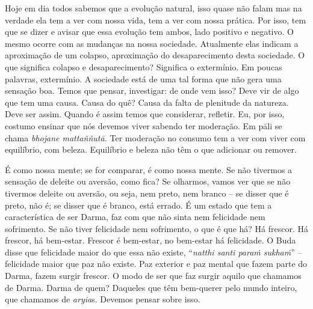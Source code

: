 Hoje em dia todos sabemos que a evolução natural, isso quase não
falam mas na verdade ela tem a ver com nossa vida, tem a ver com nossa
prática. Por isso, tem que se dizer e avisar que essa evolução tem
ambos, lado positivo e negativo. O mesmo ocorre com as mudanças na
nossa sociedade. Atualmente elas indicam a aproximação de um colapso,
aproximação do desaparecimento desta sociedade. O que significa colapso
e desaparecimento? Significa o extermínio. Em poucas palavras,
extermínio. A sociedade está de uma tal forma que não gera uma sensação
boa. Temos que pensar, investigar: de onde vem isso? Deve vir de algo
que tem uma causa. Causa do quê? Causa da falta de plenitude da
natureza. Deve ser assim. Quando é assim temos que considerar,
refletir. Eu, por isso, costumo ensinar que nós devemos viver sabendo
ter moderação. Em pāli se chama \emph{bhojane mattaññutā.} Ter
moderação no consumo tem a ver com viver com equilíbrio, com beleza.
Equilíbrio e beleza não têm o que adicionar ou remover. 

É como nossa mente; se for comparar, é como nossa mente. Se não
tivermos a sensação de deleite ou aversão, como fica? Se olharmos,
vamos ver que se não tivermos deleite ou aversão, ou seja, nem preto,
nem branco – se disser que é preto, não é; se disser que é branco, está
errado. É um estado que tem a característica de ser Darma, faz com que
não sinta nem felicidade nem sofrimento. Se não tiver felicidade nem
sofrimento, o que é que há? Há frescor. Há frescor, há bem-estar.
Frescor é bem-estar, no bem-estar há felicidade. O Buda disse que
felicidade maior do que essa não existe, “\emph{natthi santi paraṁ
sukhaṁ}” – felicidade maior que paz não existe. Paz exterior e
paz mental que fazem parte do Darma, fazem surgir frescor. O modo de
ser que faz surgir aquilo que chamamos de Darma. Darma de quem?
Daqueles que têm bem-querer pelo mundo inteiro, que chamamos de
\emph{aryia}s. Devemos pensar sobre isso. 

